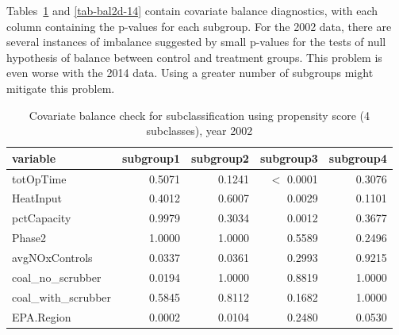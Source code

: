 \begin{enumerate}[(a)]
  Tables~\ref{tab-bal2d-02} and \ref{tab-bal2d-14} contain covariate
  balance diagnostics, with each column containing the p-values for
  each subgroup.  For the 2002 data, there are several instances of
  imbalance suggested by small p-values for the tests of null
  hypothesis of balance between control and treatment groups.
  This problem is even worse with the 2014 data.  Using a greater
  number of subgroups might mitigate this problem.

  \begin{table}[ht]
    \centering
    \begin{tabular}{lrrrr}
      \toprule
      variable             & subgroup1 & subgroup2 & subgroup3  & subgroup4 \\ 
      \midrule
      totOpTime            & 0.5071    & 0.1241    & $<$ 0.0001 & 0.3076    \\ 
      HeatInput            & 0.4012    & 0.6007    & 0.0029     & 0.1101    \\ 
      pctCapacity          & 0.9979    & 0.3034    & 0.0012     & 0.3677    \\ 
      Phase2               & 1.0000    & 1.0000    & 0.5589     & 0.2496    \\ 
      avgNOxControls       & 0.0337    & 0.0361    & 0.2993     & 0.9215    \\ 
      coal\_no\_scrubber   & 0.0194    & 1.0000    & 0.8819     & 1.0000    \\ 
      coal\_with\_scrubber & 0.5845    & 0.8112    & 0.1682     & 1.0000        \\ 
      EPA.Region           & 0.0002    & 0.0104    & 0.2480     & 0.0530    \\ 
      \bottomrule
    \end{tabular}
    \caption{Covariate balance check for subclassification using propensity score (4 subclasses), year 2002} 
    \label{tab-bal2d-02}
  \end{table}


\end{enumerate}
